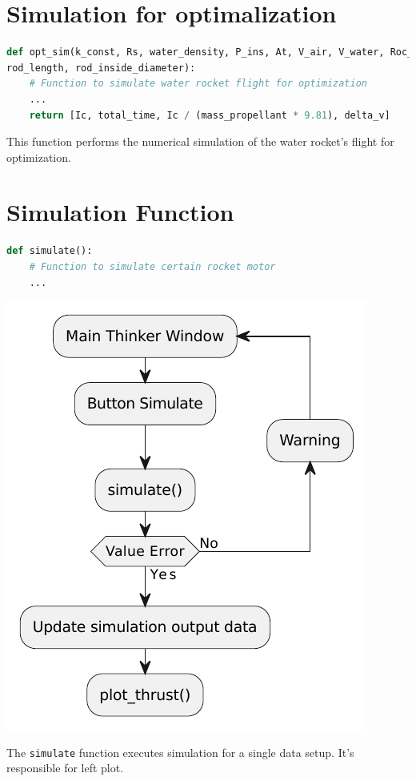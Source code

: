 \documentclass{report}
\begin{document}
\section{Simulation for optimalization}

\begin{lstlisting}[language=Python]
def opt_sim(k_const, Rs, water_density, P_ins, At, V_air, V_water, Roc_mass, T, 
rod_length, rod_inside_diameter):
    # Function to simulate water rocket flight for optimization
    ...
    return [Ic, total_time, Ic / (mass_propellant * 9.81), delta_v]
\end{lstlisting}

This function performs the numerical simulation of the water rocket's flight for optimization.


\section{Simulation Function}

\begin{lstlisting}[language=Python]
def simulate():
    # Function to simulate certain rocket motor
    ...
\end{lstlisting}
\begin{center}
\includegraphics[scale=1]{simulate}
\end{center}

The \texttt{simulate} function executes simulation for a single data setup. It's responsible for left plot.
\end{document}
